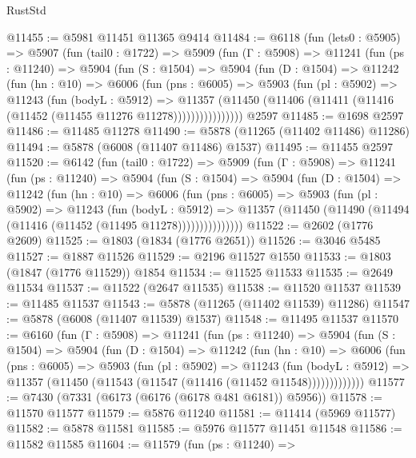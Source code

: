 \begin{lexlean}{RustStd}
\begin{coremodule}
@11455 := @5981 @11451 @11365 @9414
@11484 := @6118
    (fun (lets0 : @5905) =>
    @5907
      (fun (tail0 : @1722) =>
      @5909
        (fun (Γ : @5908) =>
        @11241
          (fun (ps : @11240) =>
          @5904
            (fun (S : @1504) =>
            @5904
              (fun (D : @1504) =>
              @11242
                (fun (hn : @10) =>
                @6006
                  (fun (pns : @6005) =>
                  @5903
                    (fun (pl : @5902) =>
                    @11243
                      (fun (bodyL : @5912) =>
                      @11357
                        (@11450
                          (@11406 (@11411 (@11416 (@11452 (@11455 @11276 @11278))))))))))))))))
    @2597
@11485 := @1698 @2597
@11486 := @11485 @11278
@11490 := @5878 (@11265 (@11402 @11486) @11286)
@11494 := @5878 (@6008 (@11407 @11486) @1537)
@11495 := @11455 @2597
@11520 := @6142
    (fun (tail0 : @1722) =>
    @5909
      (fun (Γ : @5908) =>
      @11241
        (fun (ps : @11240) =>
        @5904
          (fun (S : @1504) =>
          @5904
            (fun (D : @1504) =>
            @11242
              (fun (hn : @10) =>
              @6006
                (fun (pns : @6005) =>
                @5903
                  (fun (pl : @5902) =>
                  @11243
                    (fun (bodyL : @5912) =>
                    @11357 (@11450 (@11490 (@11494 (@11416 (@11452 (@11495 @11278)))))))))))))))
@11522 := @2602 (@1776 @2609)
@11525 := @1803 (@1834 (@1776 @2651))
@11526 := @3046 @5485
@11527 := @1887 @11526
@11529 := @2196 @11527 @1550
@11533 := @1803 (@1847 (@1776 @11529)) @1854
@11534 := @11525 @11533
@11535 := @2649 @11534
@11537 := @11522 (@2647 @11535)
@11538 := @11520 @11537
@11539 := @11485 @11537
@11543 := @5878 (@11265 (@11402 @11539) @11286)
@11547 := @5878 (@6008 (@11407 @11539) @1537)
@11548 := @11495 @11537
@11570 := @6160
    (fun (Γ : @5908) =>
    @11241
      (fun (ps : @11240) =>
      @5904
        (fun (S : @1504) =>
        @5904
          (fun (D : @1504) =>
          @11242
            (fun (hn : @10) =>
            @6006
              (fun (pns : @6005) =>
              @5903
                (fun (pl : @5902) =>
                @11243
                  (fun (bodyL : @5912) =>
                  @11357 (@11450 (@11543 (@11547 (@11416 (@11452 @11548)))))))))))))
@11577 := @7430 (@7331 (@6173 (@6176 (@6178 @481 @6181)) @5956))
@11578 := @11570 @11577
@11579 := @5876 @11240
@11581 := @11414 (@5969 @11577)
@11582 := @5878 @11581
@11585 := @5976 @11577 @11451 @11548
@11586 := @11582 @11585
@11604 := @11579
    (fun (ps : @11240) =>

\end{coremodule}
\end{lexlean}
